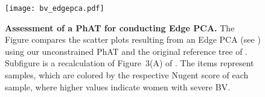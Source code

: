 \begin{figure}[hpbt]
    \centering
    \texttt{[image: bv\_edgepca.pdf]}
    \begin{subfigure}{0pt}
        \label{fig:bv_edgepca:sub:edgepca_art}
    \end{subfigure}
    \begin{subfigure}{0pt}
        \label{fig:bv_edgepca:sub:edgepca_orig}
    \end{subfigure}
    \caption[Assessment of a \acs{PhAT} for conducting Edge PCA]{
        \textbf{Assessment of a \acs{PhAT} for conducting Edge PCA.}
        The Figure compares the scatter plots resulting from an Edge PCA
        (see )
        using  our unconstrained  \acs{PhAT} and
         the original reference tree of \citep{Srinivasan2012}.
        Subfigure  is a recalculation of Figure~3(A) of \citep{Srinivasan2012}.
        The items represent samples, which are colored by the respective Nugent score of each sample,
        where higher values indicate women with severe \acl{BV}.
    }
    \label{fig:bv_edgepca}
\end{figure}

